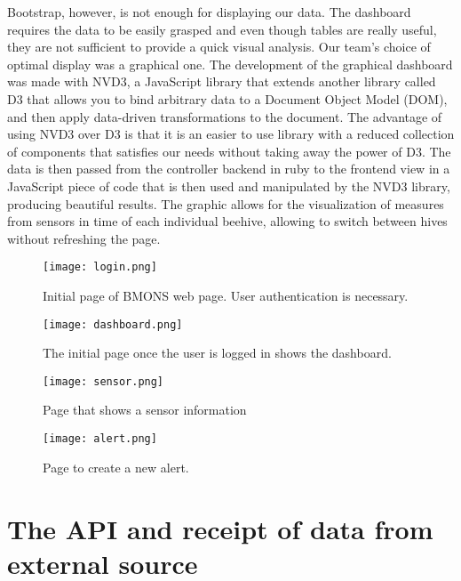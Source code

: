 Bootstrap, however, is not enough for displaying our data. The dashboard requires the data to be easily grasped and even though tables are really useful, they are not sufficient to provide a quick visual analysis. Our team's choice of optimal display was a graphical one. The development of the graphical dashboard was made with NVD3, a JavaScript library that extends another library called D3 that allows you to bind arbitrary data to a Document Object Model (DOM), and then apply data-driven transformations to the document. The advantage of using NVD3 over D3 is that it is an easier to use library with a reduced collection of components that satisfies our needs without taking away the power of D3. The data is then passed from the controller backend in ruby to the frontend view in a JavaScript piece of code that is then used and manipulated by the NVD3 library, producing beautiful results. The graphic allows for the visualization of measures from sensors in time of each individual beehive, allowing to switch between hives without refreshing the page. 

\clearpage
\begin{figure}[h]
\centering\texttt{[image: login.png]}
\caption{\label{fig:login} Initial page of BMONS web page. User authentication is necessary. }
\end{figure}

\begin{figure}[h]
\centering\texttt{[image: dashboard.png]}
\caption{\label{fig:dashboard} The initial page once the user is logged in shows the dashboard. }
\end{figure}

\begin{figure}[h]
\centering\texttt{[image: sensor.png]}
\caption{\label{fig:sensor} Page that shows a sensor information }
\end{figure}

\begin{figure}[h]
\centering\texttt{[image: alert.png]}
\caption{\label{fig:alert} Page to create a new alert. }
\end{figure}

\clearpage

\section{The API and receipt of data from external source}

